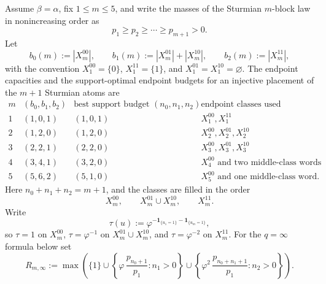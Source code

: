 \begin{proposition}
\label{prop:small-m-endpoint-budget}
Assume \(\beta=\alpha\), fix \(1\le m\le5\), and write the masses of the
Sturmian \(m\)-block law in nonincreasing order as
\[
p_1\ge p_2\ge\cdots\ge p_{m+1}>0.
\]
Let
\[
b_0(m):=|X_m^{00}|,\qquad
b_1(m):=|X_m^{01}|+|X_m^{10}|,\qquad
b_2(m):=|X_m^{11}|,
\]
with the convention \(X_1^{00}=\{0\}\), \(X_1^{11}=\{1\}\), and
\(X_1^{01}=X_1^{10}=\varnothing\).  The endpoint capacities and the
support-optimal endpoint budgets for an injective placement of the \(m+1\)
Sturmian atoms are
\[
\begin{array}{c|c|c|c}
m & (b_0,b_1,b_2) & \text{best support budget }(n_0,n_1,n_2)
& \text{endpoint classes used}\\
\hline
1 & (1,0,1) & (1,0,1) & X_1^{00},X_1^{11}\\
2 & (1,2,0) & (1,2,0) & X_2^{00},X_2^{01},X_2^{10}\\
3 & (2,2,1) & (2,2,0) & X_3^{00},X_3^{01},X_3^{10}\\
4 & (3,4,1) & (3,2,0) & X_4^{00}\text{ and two middle-class words}\\
5 & (5,6,2) & (5,1,0) & X_5^{00}\text{ and one middle-class word}.
\end{array}
\]
Here \(n_0+n_1+n_2=m+1\), and the classes are filled in the order
\[
X_m^{00},\qquad X_m^{01}\cup X_m^{10},\qquad X_m^{11}.
\]
Write
\[
\tau(u):=\varphi^{-\mathbf 1_{\{u_1=1\}}-\mathbf 1_{\{u_m=1\}}},
\]
so \(\tau=1\) on \(X_m^{00}\), \(\tau=\varphi^{-1}\) on
\(X_m^{01}\cup X_m^{10}\), and \(\tau=\varphi^{-2}\) on \(X_m^{11}\).
For the \(q=\infty\) formula below set
\[
R_{m,\infty}:=
\max\!\left(
\{1\}
\cup
\left\{\varphi\,\frac{p_{n_0+1}}{p_1}: n_1>0\right\}
\cup
\left\{\varphi^2\,\frac{p_{n_0+n_1+1}}{p_1}: n_2>0\right\}
\right).
\]


\end{proposition}
